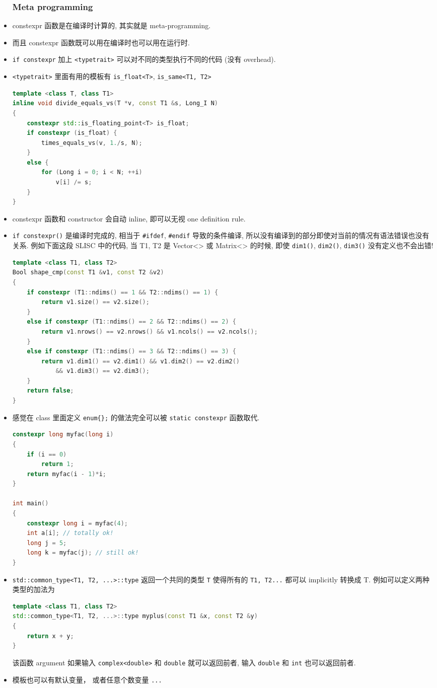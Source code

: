 \begin{itemize}
\subsubsection{Meta programming}
\item constexpr 函数是在编译时计算的, 其实就是 meta-programming.
\item 而且 constexpr 函数既可以用在编译时也可以用在运行时.
\item \verb`if constexpr` 加上 \verb`<typetrait>` 可以对不同的类型执行不同的代码 (没有 overhead).
\item \verb`<typetrait>` 里面有用的模板有 \verb`is_float<T>`, \verb`is_same<T1, T2>`
\begin{lstlisting}[language=cpp]
template <class T, class T1>
inline void divide_equals_vs(T *v, const T1 &s, Long_I N)
{
	constexpr std::is_floating_point<T> is_float;
	if constexpr (is_float) {
		times_equals_vs(v, 1./s, N);
	}
	else {
		for (Long i = 0; i < N; ++i)
			v[i] /= s;
	}
}
\end{lstlisting}
\item constexpr 函数和 constructor 会自动 inline, 即可以无视 one definition rule.
\item \verb`if constexpr()` 是编译时完成的, 相当于 \verb`#ifdef`, \verb`#endif` 导致的条件编译, 所以没有编译到的部分即使对当前的情况有语法错误也没有关系. 例如下面这段 SLISC 中的代码, 当 T1, T2 是 Vector<> 或 Matrix<> 的时候, 即使 \verb`dim1()`, \verb`dim2()`, \verb`dim3()` 没有定义也不会出错!
\begin{lstlisting}[language=cpp]
template <class T1, class T2>
Bool shape_cmp(const T1 &v1, const T2 &v2)
{
	if constexpr (T1::ndims() == 1 && T2::ndims() == 1) {
		return v1.size() == v2.size();
	}
	else if constexpr (T1::ndims() == 2 && T2::ndims() == 2) {
		return v1.nrows() == v2.nrows() && v1.ncols() == v2.ncols();
	}
	else if constexpr (T1::ndims() == 3 && T2::ndims() == 3) {
		return v1.dim1() == v2.dim1() && v1.dim2() == v2.dim2()
			&& v1.dim3() == v2.dim3();
	}
	return false;
}
\end{lstlisting}
\item 感觉在 class 里面定义 \verb`enum{};` 的做法完全可以被 \verb`static constexpr` 函数取代.
\begin{lstlisting}[language=cpp]
constexpr long myfac(long i)
{
	if (i == 0)
		return 1;
	return myfac(i - 1)*i;
}

int main()
{
	constexpr long i = myfac(4);
	int a[i]; // totally ok!
	long j = 5;
	long k = myfac(j); // still ok!
}
\end{lstlisting}
\item \verb`std::common_type<T1, T2, ...>::type` 返回一个共同的类型 \verb`T` 使得所有的 \verb`T1, T2...` 都可以 implicitly 转换成 T. 例如可以定义两种类型的加法为
\begin{lstlisting}[language=cpp]
template <class T1, class T2>
std::common_type<T1, T2, ...>::type myplus(const T1 &x, const T2 &y)
{
	return x + y;
}
\end{lstlisting}
该函数 argument 如果输入 \verb`complex<double>` 和 \verb`double` 就可以返回前者, 输入 \verb`double` 和 \verb`int` 也可以返回前者.
\item 模板也可以有默认变量， 或者任意个数变量 \verb|...|
\end{itemize}

